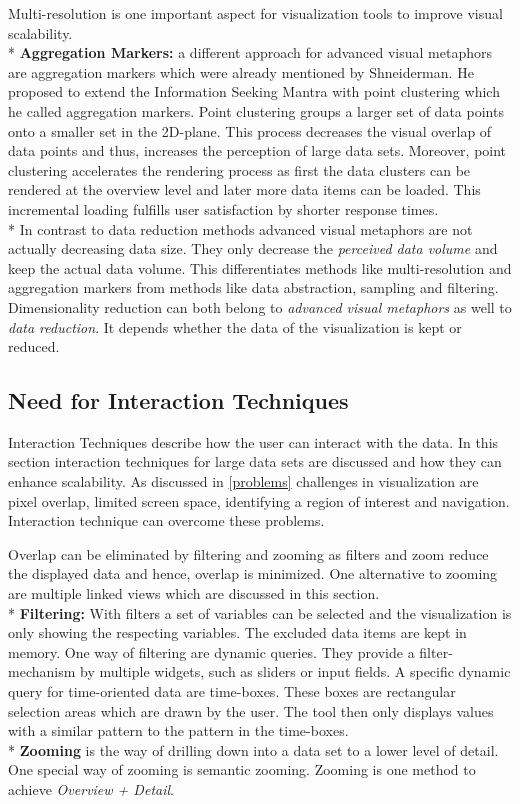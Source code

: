 Multi-resolution is one important aspect for visualization tools to improve visual scalability.\\*
\textbf{Aggregation Markers:} a different approach for advanced visual metaphors are aggregation markers which were already mentioned by Shneiderman\cite{Shneiderman2008}. He proposed to extend the Information Seeking Mantra\cite{Shneiderman1996} with point clustering which he called aggregation markers. Point clustering groups a larger set of data points onto a smaller set in the 2D-plane\cite{Morrison2014}. This process decreases the visual overlap of data points and thus, increases the perception of large data sets. Moreover, point clustering accelerates the rendering process as first the data clusters  can be rendered at the overview level and later more data items can be loaded. This incremental loading fulfills user satisfaction by shorter response times.\\*
In contrast to data reduction methods advanced visual metaphors are not actually decreasing data size. They only decrease the \textit{perceived data volume} and keep the actual data volume. This differentiates methods like multi-resolution and aggregation markers from methods like data abstraction, sampling and filtering. Dimensionality reduction can both belong to \textit{advanced visual metaphors} as well to \textit{data reduction}. It depends whether the data of the visualization is kept or reduced. 

\subsection{Need for Interaction Techniques}
Interaction Techniques describe how the user can interact with the data. In this section interaction techniques for large data sets are discussed and how they can enhance scalability. As discussed in \ref{problems} challenges in visualization are pixel overlap, limited screen space, identifying a region of interest and navigation. Interaction technique can overcome these problems. 
\par
Overlap can be eliminated by filtering and zooming as filters and zoom reduce the displayed data and hence, overlap is minimized. One alternative to zooming are multiple linked views which are discussed in this section.\\*
\textbf{Filtering:} With filters a set of variables can be selected and the visualization is only showing the respecting variables. The excluded data items are kept in memory.
One way of filtering are dynamic queries. They provide a filter-mechanism by multiple widgets, such as sliders or input fields\cite{Hochheiser2004,Shneiderman2008,Aigner2011}. A specific dynamic query for time-oriented data are time-boxes. These boxes are rectangular selection areas which are drawn by the user. The tool then only displays values with a similar pattern to the pattern in the time-boxes.\\*
\textbf{Zooming} is the way of drilling down into a data set to a lower level of detail. One special way of zooming is semantic zooming\cite{boulos2003use}. Zooming is one method to achieve \textit{Overview + Detail}.
\par


